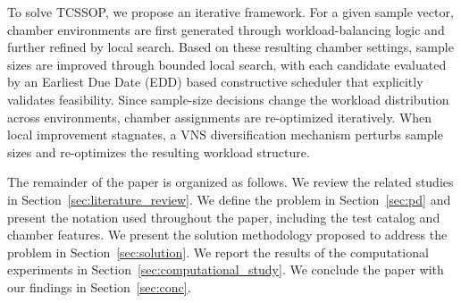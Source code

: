 To solve TCSSOP, we propose an iterative framework. For a given sample vector, chamber environments are first generated through workload-balancing logic and further refined by local search. Based on these resulting chamber settings, sample sizes are improved through bounded local search, with each candidate evaluated by an Earliest Due Date (EDD) based constructive scheduler that explicitly validates feasibility. Since sample-size decisions change the workload distribution across environments, chamber assignments are re-optimized iteratively. When local improvement stagnates, a VNS diversification mechanism perturbs sample sizes and re-optimizes the resulting workload structure.

The remainder of the paper is organized as follows. We review the related studies in Section~\ref{sec:literature_review}. We define the problem in Section~\ref{sec:pd} and present the notation used throughout the paper, including the test catalog and chamber features. We present the solution methodology proposed to address the problem in Section~\ref{sec:solution}. We report the results of the computational experiments in Section~\ref{sec:computational_study}. We conclude the paper with our findings in Section~\ref{sec:conc}.
